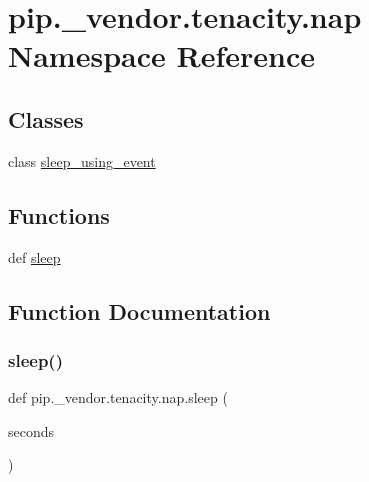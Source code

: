 \hypertarget{namespacepip_1_1__vendor_1_1tenacity_1_1nap}{}\section{pip.\+\_\+vendor.\+tenacity.\+nap Namespace Reference}
\label{namespacepip_1_1__vendor_1_1tenacity_1_1nap}
\subsection*{Classes}
\begin{DoxyCompactItemize}
\item 
class \hyperlink{classpip_1_1__vendor_1_1tenacity_1_1nap_1_1sleep__using__event}{sleep\+\_\+using\+\_\+event}
\end{DoxyCompactItemize}
\subsection*{Functions}
\begin{DoxyCompactItemize}
\item 
def \hyperlink{namespacepip_1_1__vendor_1_1tenacity_1_1nap_aa3424bd8f0e362401e70e37a073fd98c}{sleep}
\end{DoxyCompactItemize}


\subsection{Function Documentation}
\mbox{\label{namespacepip_1_1__vendor_1_1tenacity_1_1nap_aa3424bd8f0e362401e70e37a073fd98c}} 
\subsubsection{\texorpdfstring{sleep()}{sleep()}}
{\footnotesize\ttfamily def pip.\+\_\+vendor.\+tenacity.\+nap.\+sleep (\begin{DoxyParamCaption}\item[{}]{seconds }\end{DoxyParamCaption})}

